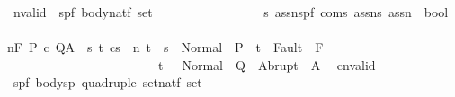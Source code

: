 \begin{isabellebody}
\isanewline
\ \ nvalid\ {\isacharcolon}{\isacharcolon}\ {\isachardoublequoteopen}{\isacharbrackleft}{\isacharparenleft}{\isacharprime}s{\isacharcomma}{\isacharprime}p{\isacharcomma}{\isacharprime}f{\isacharparenright}\ body{\isacharcomma}nat{\isacharcomma}{\isacharprime}f\ set{\isacharcomma}\ \isanewline
\ \ \ \ \ \ \ \ \ \ \ \ \ \ \ \ {\isacharprime}s\ assn{\isacharcomma}{\isacharparenleft}{\isacharprime}s{\isacharcomma}{\isacharprime}p{\isacharcomma}{\isacharprime}f{\isacharparenright}\ com{\isacharcomma}{\isacharprime}s\ assn{\isacharcomma}{\isacharprime}s\ assn{\isacharbrackright}\ {\isacharequal}{\isachargreater}\ bool{\isachardoublequoteclose}\isanewline
\ \ \ \ \ \ \ \ \ \ \ \ \ \ \ \ {\isacharparenleft}{\isachardoublequoteopen}{\isacharunderscore}{\isasymTurnstile}{\isacharunderscore}{\isacharcolon}\isactrlbsub {\isacharprime}{\isacharslash}{\isacharunderscore}\isactrlesub {\isacharslash}\ {\isacharunderscore}\ {\isacharunderscore}\ {\isacharunderscore}{\isacharcomma}{\isacharunderscore}{\isachardoublequoteclose}\ \ {\isacharbrackleft}{}{}{\isacharcomma}{}{}{\isacharcomma}{}{}{\isacharcomma}{}{}{}{}{\isacharcomma}\ {}{}{\isacharcomma}\ {}{}{}{}{\isacharcomma}{}{}{}{}{\isacharbrackright}\ {}{}{\isacharparenright}\isanewline
{}\isanewline
\ {\isachardoublequoteopen}{\isasymGamma}{\isasymTurnstile}n{\isacharcolon}\isactrlbsub {\isacharslash}F\isactrlesub \ P\ c\ Q{\isacharcomma}A\ {\isasymequiv}\ {\isasymforall}s\ t{\isachardot}\ {\isasymGamma}{\isasymturnstile}{\isasymlangle}c{\isacharcomma}s\ {\isasymrangle}\ {\isacharequal}n{\isasymRightarrow}\ t\ {\isasymlongrightarrow}\ s\ {\isasymin}\ Normal\ {\isacharbackquote}\ P\ {\isasymlongrightarrow}\ t\ {\isasymnotin}\ Fault\ {\isacharbackquote}\ F\ \isanewline
\ \ \ \ \ \ \ \ \ \ \ \ \ \ \ \ \ \ \ \ \ \ \ \ {\isasymlongrightarrow}\ t\ {\isasymin}\ \ Normal\ {\isacharbackquote}\ Q\ {\isasymunion}\ Abrupt\ {\isacharbackquote}\ A{\isachardoublequoteclose}\isanewline
\isanewline
\isanewline
{}\isamarkupfalse%
\isanewline
\ \ cnvalid{\isacharcolon}{\isacharcolon}\isanewline
\ \ {\isachardoublequoteopen}{\isacharbrackleft}{\isacharparenleft}{\isacharprime}s{\isacharcomma}{\isacharprime}p{\isacharcomma}{\isacharprime}f{\isacharparenright}\ body{\isacharcomma}{\isacharparenleft}{\isacharprime}s{\isacharcomma}{\isacharprime}p{\isacharparenright}\ quadruple\ set{\isacharcomma}nat{\isacharcomma}{\isacharprime}f\ set{\isacharcomma}\ \isanewline

\end{isabellebody}
